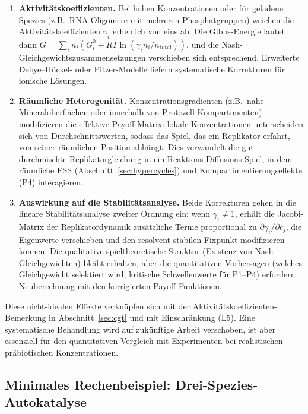 \documentclass[12pt,a4paper]{article}
\theoremstyle{remark}
\begin{document}
\begin{enumerate}
    \item \textbf{Aktivit\"atskoeffizienten.} Bei hohen Konzentrationen oder f\"ur geladene Spezies (z.B.\ RNA-Oligomere mit mehreren Phosphatgruppen) weichen die Aktivit\"atskoeffizienten $\gamma_i$ erheblich von eins ab. Die Gibbs-Energie lautet dann $G = \sum_i n_i (G_i^0 + RT\ln(\gamma_i n_i / n_{\mathrm{total}}))$, und die Nash-Gleichgewichtszusammensetzungen verschieben sich entsprechend. Erweiterte Debye--H\"uckel- oder Pitzer-Modelle liefern systematische Korrekturen f\"ur ionische L\"osungen.
    \item \textbf{R\"aumliche Heterogenit\"at.} Konzentrationsgradienten (z.B.\ nahe Mineraloberfl\"achen oder innerhalb von Protozell-Kompartimenten) modifizieren die effektive Payoff-Matrix: lokale Konzentrationen unterscheiden sich von Durchschnittswerten, sodass das Spiel, das ein Replikator erf\"ahrt, von seiner r\"aumlichen Position abh\"angt. Dies verwandelt die gut durchmischte Replikatorgleichung in ein Reaktions-Diffusions-Spiel, in dem r\"aumliche ESS (Abschnitt~\ref{sec:hypercycles}) und Kompartimentierungseffekte (P4) interagieren.
    \item \textbf{Auswirkung auf die Stabilit\"atsanalyse.} Beide Korrekturen gehen in die lineare Stabilit\"atsanalyse zweiter Ordnung ein: wenn $\gamma_i \neq 1$, erh\"alt die Jacobi-Matrix der Replikatordynamik zus\"atzliche Terme proportional zu $\partial\gamma_i/\partial c_j$, die Eigenwerte verschieben und den resolvent-stabilen Fixpunkt modifizieren k\"onnen. Die qualitative spieltheoretische Struktur (Existenz von Nash-Gleichgewichten) bleibt erhalten, aber die quantitativen Vorhersagen (welches Gleichgewicht selektiert wird, kritische Schwellenwerte f\"ur P1--P4) erfordern Neuberechnung mit den korrigierten Payoff-Funktionen.
\end{enumerate}

\noindent
Diese nicht-idealen Effekte verkn\"upfen sich mit der Aktivit\"atskoeffizienten-Bemerkung in Abschnitt~\ref{sec:cgt} und mit Einschr\"ankung (L5). Eine systematische Behandlung wird auf zuk\"unftige Arbeit verschoben, ist aber essenziell f\"ur den quantitativen Vergleich mit Experimenten bei realistischen pr\"abiotischen Konzentrationen.

\subsection{Minimales Rechenbeispiel: Drei-Spezies-Autokatalyse}\label{sec:3species}
\end{document}
